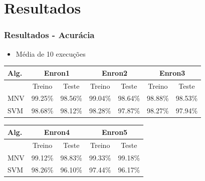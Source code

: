 \documentclass[10pt]{beamer}
\begin{document}
\section{Resultados}


\begin{frame}
 \frametitle{Resultados - Acurácia}

 \begin{itemize}

    \item Média de 10 execuções
  \end{itemize}


  \begin{table}[!htb]
      \footnotesize
      \centering
      \begin{tabular}{l|cc|cc|cc}
      \toprule
      Alg. & \multicolumn{2}{c}{Enron1} & \multicolumn{2}{|c}{Enron2} & \multicolumn{2}{|c}{Enron3} \\
      \toprule
      \     & Treino & Teste     & Treino & Teste    &  Treino & Teste    \\
      \midrule
      MNV &    99.25\% &  98.56\%   & 99.04\% & 98.64\%   & 98.88\% & 98.53\%  \\
      SVM &    98.68\% &  98.12\%   & 98.28\% & 97.87\%   & 98.27\% & 97.94\%   \\
      \bottomrule
      \end{tabular}

      \end{table}


    \begin{table}[!htb]
      \footnotesize
      \centering
      \begin{tabular}{l|cc|cc}
      \toprule
      Alg. & \multicolumn{2}{c}{Enron4} & \multicolumn{2}{|c}{Enron5} \\
      \toprule
      \     & Treino & Teste     & Treino & Teste   \\
      \midrule
      MNV &    99.12\% &  98.83\%   & 99.33\% & 99.18\% \\
      SVM &    98.26\% &  96.10\%   & 97.44\% & 96.17\%  \\
      \bottomrule
      \end{tabular}

      \end{table}


\end{frame}
\end{document}
